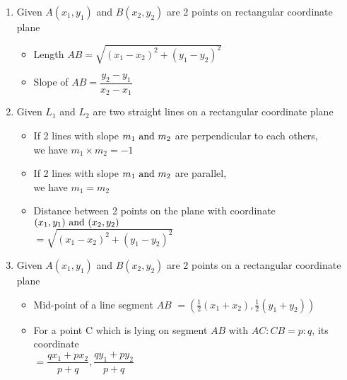 
\begin{mysubsection}{}
    \begin{enumerate}
        \item Given $A(x_1,y_1)$ and $B(x_2,y_2)$ are 2 points on rectangular coordinate plane
            \begin{itemize}
                \item Length $AB=\sqrt{(x_1-x_2)^2+(y_1-y_2)^2}$
                \item Slope of $AB=\dfrac{y_2-y_1}{x_2-x_1}$
            \end{itemize}
        \item Given $L_1$ and $L_2$ are two straight lines on a rectangular coordinate plane
            \begin{itemize}
                \item If 2 lines with slope $m_1\textnormal{ and }m_2$ are perpendicular to each others,\\
                    we have $m_1\times m_2=-1$
                \item If 2 lines with slope $m_1\textnormal{ and }m_2$ are parallel,\\
                    we have $m_1=m_2$
                \item Distance between 2 points on the plane with coordinate $(x_1,y_1)\textnormal{ and }(x_2,y_2)$\\
                    $=\sqrt{(x_1-x_2)^2+(y_1-y_2)^2}$
            \end{itemize}
        \item Given $A(x_1,y_1)$ and $B(x_2,y_2)$ are 2 points on a rectangular coordinate plane
            \begin{itemize}
                \item Mid-point of a line segment $AB$
                    $=(\frac{1}{2} (x_1+x_2),\frac{1}{2} (y_1+y_2))$
                \item For a point C which is lying on segment $AB$ with $AC:CB=p:q$, its coordinate\\
                    $=\dfrac{qx_1+px_2}{p+q}, \dfrac{qy_1+py_2}{p+q}$
            \end{itemize}
    \end{enumerate}
\end{mysubsection}


